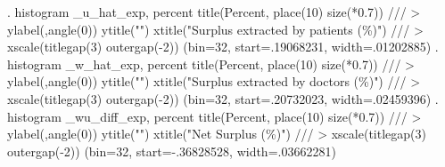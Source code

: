 . histogram _u_hat_exp, percent title(Percent, place(10) size(*0.7))               ///
>            ylabel(,angle(0)) ytitle("") xtitle("Surplus extracted by patients (\%)") ///
>            xscale(titlegap(3) outergap(-2))
(bin=32, start=.19068231, width=.01202885)
{\smallskip}
. histogram _w_hat_exp, percent title(Percent, place(10) size(*0.7))               ///
>            ylabel(,angle(0)) ytitle("") xtitle("Surplus extracted by doctors (\%)")  ///
>            xscale(titlegap(3) outergap(-2))
(bin=32, start=.20732023, width=.02459396)
{\smallskip}
. histogram _wu_diff_exp, percent title(Percent, place(10) size(*0.7))             ///
>            ylabel(,angle(0)) ytitle("") xtitle("Net Surplus (\%)")                   ///
>            xscale(titlegap(3) outergap(-2))
(bin=32, start=-.36828528, width=.03662281)

